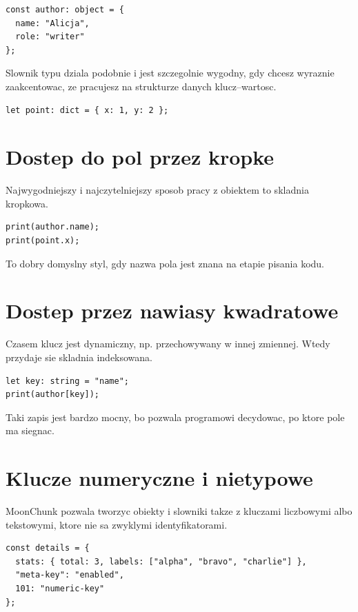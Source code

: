 \begin{lstlisting}[style=moonchunk,caption={Prosty obiekt}]
const author: object = {
  name: "Alicja",
  role: "writer"
};
\end{lstlisting}

Slownik typu  dziala podobnie i jest szczegolnie wygodny, gdy chcesz wyraznie
zaakcentowac, ze pracujesz na strukturze danych klucz--wartosc.

\begin{lstlisting}[style=moonchunk,caption={Slownik dict}]
let point: dict = { x: 1, y: 2 };
\end{lstlisting}

\section{Dostep do pol przez kropke}
Najwygodniejszy i najczytelniejszy sposob pracy z obiektem to skladnia kropkowa.

\begin{lstlisting}[style=moonchunk,caption={Dostep do pola obiektu}]
print(author.name);
print(point.x);
\end{lstlisting}

To dobry domyslny styl, gdy nazwa pola jest znana na etapie pisania kodu.

\section{Dostep przez nawiasy kwadratowe}
Czasem klucz jest dynamiczny, np. przechowywany w innej zmiennej. Wtedy przydaje sie
skladnia indeksowana.

\begin{lstlisting}[style=moonchunk,caption={Dynamiczny dostep do pola}]
let key: string = "name";
print(author[key]);
\end{lstlisting}

Taki zapis jest bardzo mocny, bo pozwala programowi decydowac, po ktore pole ma siegnac.

\section{Klucze numeryczne i nietypowe}
MoonChunk pozwala tworzyc obiekty i slowniki takze z kluczami liczbowymi albo tekstowymi,
ktore nie sa zwyklymi identyfikatorami.

\begin{lstlisting}[style=moonchunk,caption={Nietypowe klucze obiektu}]
const details = {
  stats: { total: 3, labels: ["alpha", "bravo", "charlie"] },
  "meta-key": "enabled",
  101: "numeric-key"
};
\end{lstlisting}

